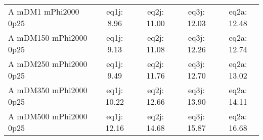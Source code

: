 \begin{table}
\begin{center}
\begin{tabular}{|l|c|c|c|c|}
 A mDM1 mPhi2000 0p25 & eq1j: 8.96 & eq2j: 11.00 & eq3j: 12.03 & eq2a: 12.48 \\ 
 A mDM150 mPhi2000 0p25 & eq1j: 9.13 & eq2j: 11.08 & eq3j: 12.26 & eq2a: 12.74 \\ 
 A mDM250 mPhi2000 0p25 & eq1j: 9.49 & eq2j: 11.76 & eq3j: 12.70 & eq2a: 13.02 \\ 
 A mDM350 mPhi2000 0p25 & eq1j: 10.22 & eq2j: 12.66 & eq3j: 13.90 & eq2a: 14.11 \\ 
 A mDM500 mPhi2000 0p25 & eq1j: 12.16 & eq2j: 14.68 & eq3j: 15.87 & eq2a: 16.68 \\ 
\hline
\end{tabular}
\end{center}
\label{tab:msb_ScorpionDMA}
\end{table}
